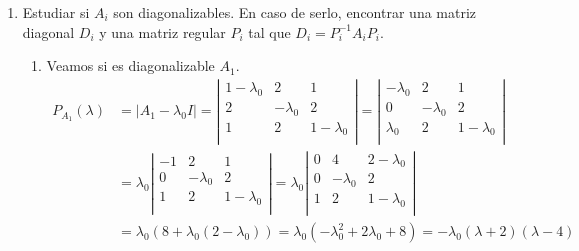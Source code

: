 \begin{ejercicio}
    \begin{enumerate}
        \item Estudiar si $A_i$ son diagonalizables. En caso de serlo, encontrar una matriz diagonal $D_i$ y una matriz regular $P_i$ tal que $D_i=P_i^{-1}A_iP_i$.

        \begin{enumerate}
            \item Veamos si es diagonalizable $A_1$.\\
            \begin{equation*}\begin{split}
                P_{A_1}(\lambda) & = |A_1-\lambda_0 I| = \left| \begin{array}{ccc}
                1-\lambda_0 & 2 & 1 \\
                2 & -\lambda_0 & 2 \\
                1 & 2 & 1-\lambda_0 \\
                \end{array}\right| =
                \left| \begin{array}{ccc}
                -\lambda_0 & 2 & 1 \\
                0 & -\lambda_0 & 2 \\
                \lambda_0 & 2 & 1-\lambda_0 \\
                \end{array}\right| \\
                & = \lambda_0
                \left| \begin{array}{ccc}
                -1 & 2 & 1 \\
                0 & -\lambda_0 & 2 \\
                1 & 2 & 1-\lambda_0 \\
                \end{array}\right| = \lambda_0
                \left| \begin{array}{ccc}
                0 & 4 & 2-\lambda_0 \\
                0 & -\lambda_0 & 2 \\
                1 & 2 & 1-\lambda_0 \\
                \end{array}\right|\\
                & = \lambda_0(8+\lambda_0(2-\lambda_0)) = \lambda_0(-\lambda_0^2+2\lambda_0+8) = -\lambda_0(\lambda+2)(\lambda-4)
            \end{split}\end{equation*}


\end{enumerate}
\end{enumerate}
\end{ejercicio}
